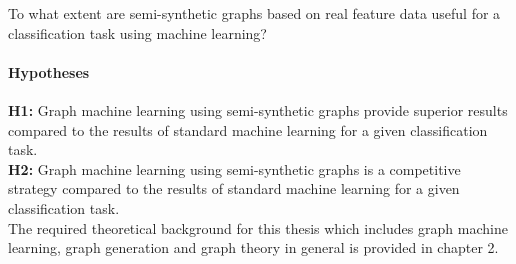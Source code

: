 	\noindent To what extent are semi-synthetic graphs based on real 
				feature data useful for a classification task using machine
				learning?

	\paragraph{Hypotheses}\mbox{}

	\noindent\textbf{H1:} Graph machine learning using semi-synthetic graphs
	provide superior results compared to the results of standard machine
	learning for a given classification task.\\

	\noindent\textbf{H2:} Graph machine learning using semi-synthetic graphs is
	a competitive strategy compared to the results of standard machine
	learning for a given classification task.\\


	\noindent The required theoretical background for this thesis which
	includes graph machine learning, graph generation and graph theory in
	general is provided in chapter 2.
